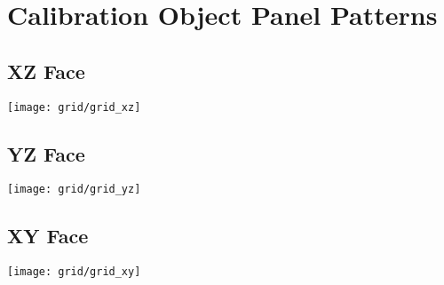 \section{Calibration Object Panel Patterns}

\subsection*{XZ Face}
\texttt{[image: grid/grid\_xz]}


\subsection*{YZ Face}
\texttt{[image: grid/grid\_yz]}

\subsection*{XY Face}
\texttt{[image: grid/grid\_xy]}
